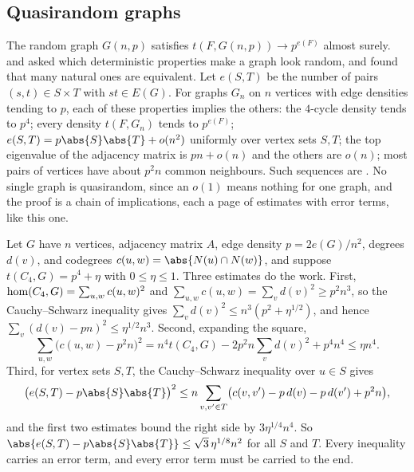 \begin{refsection}
\subsection{Quasirandom graphs}

The random graph $G(n,p)$ satisfies $t(F,G(n,p))\to p^{e(F)}$ almost surely. \textcite{Thomason1987} and \textcite{ChungGrahamWilson1989} asked which deterministic properties make a graph look random, and found that many natural ones are equivalent. Let $e(S,T)$ be the number of pairs $(s,t)\in S\times T$ with $st\in E(G)$. For graphs $G_n$ on $n$ vertices with edge densities tending to $p$, each of these properties implies the others: the $4$-cycle density tends to $p^4$; every density $t(F,G_n)$ tends to $p^{e(F)}$; $e(S,T)=p\abs{S}\abs{T}+o(n^2)$ uniformly over vertex sets $S,T$; the top eigenvalue of the adjacency matrix is $pn+o(n)$ and the others are $o(n)$; most pairs of vertices have about $p^2n$ common neighbours. Such sequences are . No single graph is quasirandom, since an $o(1)$ means nothing for one graph, and the proof is a chain of implications, each a page of estimates with error terms, like this one.

\begin{aside}
Let $G$ have $n$ vertices, adjacency matrix $A$, edge density $p=2e(G)/n^2$, degrees $d(v)$, and codegrees $c(u,w)=\abs{N(u)\cap N(w)}$, and suppose $t(C_4,G)=p^4+\eta$ with $0\le\eta\le1$. Three estimates do the work. First, $\operatorname{hom}(C_4,G)=\sum_{u,w}c(u,w)^2$ and $\sum_{u,w}c(u,w)=\sum_v d(v)^2\ge p^2n^3$, so the Cauchy--Schwarz inequality gives $\sum_v d(v)^2\le n^3(p^2+\eta^{1/2})$, and hence $\sum_v(d(v)-pn)^2\le\eta^{1/2}n^3$. Second, expanding the square,
\[
  \sum_{u,w}\bigl(c(u,w)-p^2n\bigr)^2=n^4t(C_4,G)-2p^2n\sum_v d(v)^2+p^4n^4\le\eta n^4 .
\]
Third, for vertex sets $S,T$, the Cauchy--Schwarz inequality over $u\in S$ gives
\[
  \bigl(e(S,T)-p\abs{S}\abs{T}\bigr)^2\le n\sum_{v,v'\in T}\bigl(c(v,v')-p\,d(v)-p\,d(v')+p^2n\bigr),
\]
and the first two estimates bound the right side by $3\eta^{1/4}n^4$. So $\abs{e(S,T)-p\abs{S}\abs{T}}\le\sqrt3\,\eta^{1/8}n^2$ for all $S$ and $T$. Every inequality carries an error term, and every error term must be carried to the end.
\end{aside}


\end{refsection}
